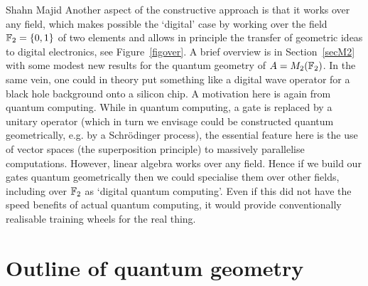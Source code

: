 \begin{artengenv}{Shahn Majid}
Another aspect of the constructive approach is that it works over any field, which makes possible the `digital' case by working over the field ${\mathbb{F}}_2=\{0,1\}$ of two elements \parencite{BasMa, MaPac1,MaPac2} and allows in principle the transfer of geometric ideas to digital electronics, see Figure~\ref{figover}. A brief overview is in Section~\ref{secM2} with some modest new results for the quantum geometry of $A=M_2({\mathbb{F}}_2)$. In the same vein, one could in theory put something like a digital wave operator for a black hole background onto a silicon chip. A motivation here is again from quantum computing. While in quantum computing, a gate is replaced by a unitary operator (which in turn we envisage could be constructed quantum geometrically, e.g. by a Schr\"odinger process), the essential feature here is the use of vector spaces (the superposition principle) to massively parallelise computations. However, linear algebra works over any field. Hence if we build our gates quantum geometrically then we could specialise them over other fields, including over ${\mathbb{F}}_2$ as `digital quantum computing'. Even if this did not have the speed benefits of actual quantum computing, it would provide conventionally realisable training wheels for the real thing. 


\section{Outline of quantum geometry} \label{secqg} 


\end{artengenv}
